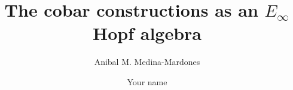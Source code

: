 \documentclass{amsart}
\theoremstyle{definition}
\begin{document}
\title{The cobar constructions as an $E_\infty$ Hopf algebra}
\author{Anibal M. Medina-Mardones}
\address{Max Plank Institute for Mathematics, Bonn, Germany}
\address{Department of Mathematics, University of Notre Dame, Notre Dame, IN, USA}
\author{Your name}
\address{Your address}


\begin{abstract}
	
\end{abstract} 

\vspace*{-1cm}

\maketitle

\tableofcontents






 


\end{document}
